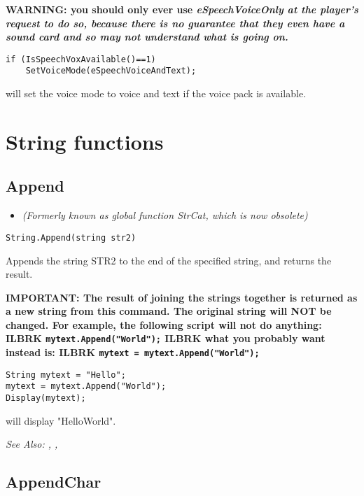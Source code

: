 \bf{WARNING:} you should only ever use \it{eSpeechVoiceOnly} at the player's request to
do so, because there is no guarantee that they even have a sound card and so may
not understand what is going on.

\begin{verbatim}
if (IsSpeechVoxAvailable()==1)
    SetVoiceMode(eSpeechVoiceAndText);
\end{verbatim}
will set the voice mode to voice and text if the voice pack is available.



\section{String functions}%


\subsection{Append}\label{String.Append}%

\begin{itemize}
\item \it{(Formerly known as global function StrCat, which is now obsolete)}
\end{itemize}

\begin{verbatim}
String.Append(string str2)
\end{verbatim}
Appends the string STR2 to the end of the specified string, and returns the result.

\bf{IMPORTANT:} The result of joining the strings together is returned as a new
string from this command. The original string will \bf{NOT} be changed. For
example, the following script will not do anything: ILBRK
\verb$mytext.Append("World");$ ILBRK
what you probably want instead is: ILBRK
\verb$mytext = mytext.Append("World");$

\begin{verbatim}
String mytext = "Hello";
mytext = mytext.Append("World");
Display(mytext);
\end{verbatim}
will display "HelloWorld".

\it{See Also:} ,
, 


\subsection{AppendChar}\label{String.AppendChar}%

